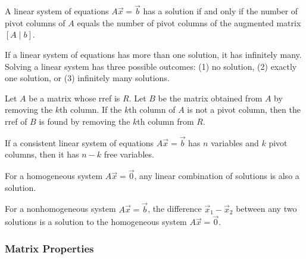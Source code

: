\begin{theorem} \label{pivot columns iff} \label{thm solution iff augmented not pivot}
A linear system of equations $A\vec x=\vec b$ has a solution if and only if the number of pivot columns of $A$ equals the number of pivot columns of the augmented matrix $[A\mid b]$.
\end{theorem}

\begin{theorem}\label{thm no, one, or infinitely many solutions}
If a linear system of equations has more than one solution, it has infinitely many.  Solving a linear system has three possible outcomes: (1) no solution, (2) exactly one solution, or (3) infinitely many solutions. 
\end{theorem}

\begin{theorem} Let $A$ be a matrix whose rref is $R$.  Let $B$ be the matrix obtained from $A$ by removing the $k$th column.  If the $k$th column of $A$ is not a pivot column, then the rref of $B$ is found by removing the $k$th column from $R$. 
\end{theorem}

\begin{theorem}\label{thm n-k free variables}
If a consistent linear system of equations $A\vec x=\vec b$ has $n$ variables and $k$ pivot columns, then it has $n-k$ free variables. 
\end{theorem}

\begin{theorem} \label{thm superposition}\label{thm homogeneous}
For a homogeneous system $A\vec x = \vec 0$, any linear combination of solutions is also a solution.
\end{theorem}

\begin{theorem}\label{thm nonhomogeneous}
For a nonhomogeneous system $A\vec x=\vec b$, the difference $\vec x_1-\vec x_2$ between any two solutions is a solution to the homogeneous system $A\vec x=\vec 0$. 
\end{theorem}





\subsubsection{Matrix Properties}

